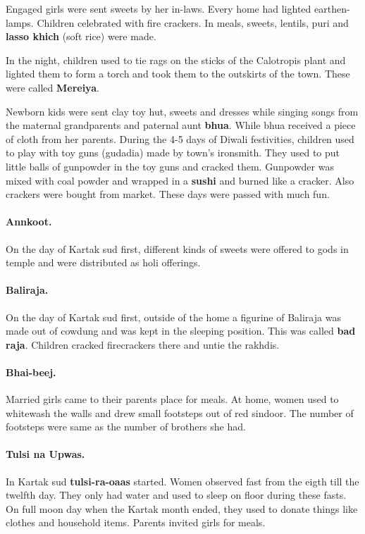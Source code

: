 Engaged girls were sent sweets by her in-laws. Every home had lighted
earthen-lamps. Children celebrated with fire crackers. In meals, sweets,
lentils, puri and \textbf{lasso khich} (soft rice) were made.

In the night, children used to tie rags on the sticks of the Calotropis plant
and lighted them to form a torch and took them to the outskirts of the town.
These were called \textbf{Mereiya}.

Newborn kids were sent clay toy hut, sweets and dresses while singing songs from the maternal grandparents and paternal
aunt \textbf{bhua}. While bhua received a piece of cloth from her parents.
During the 4-5 days of Diwali festivities, children used to play with toy guns
(gudadia) made by town's ironsmith. They used to put little balls of gunpowder in the toy
guns and cracked them. Gunpowder was mixed with coal powder and wrapped in a
\textbf{sushi} and burned like a cracker. Also crackers were bought from market.
These days were passed with much fun.
\paragraph{Annkoot.} On the day of Kartak sud first, different kinds of sweets
were offered to gods in temple and were distributed as holi offerings.
\paragraph{Baliraja.} On the day of Kartak sud first, outside of the home a
figurine of Baliraja was made out of cowdung and was kept in the sleeping
position. This was called \textbf{bad raja}. Children cracked firecrackers there
and untie the rakhdis.
\paragraph{Bhai-beej.} Married girls came to their parents place for meals. At
home, women used to whitewash the walls and drew small footsteps out of red
sindoor. The number of footsteps were same as the number of brothers she had.
\paragraph{Tulsi na Upwas.} In Kartak sud \textbf{tulsi-ra-oaas} started. Women
observed fast from the eigth till the twelfth day. They only had water and used
to sleep on floor during these fasts. On full moon day when the Kartak month
ended, they used to donate things like clothes and household items. Parents
invited girls for meals.
